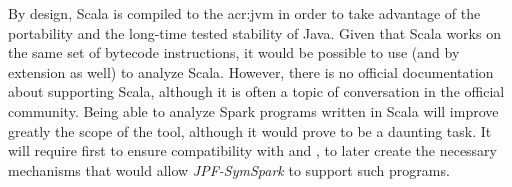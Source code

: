 By design, Scala is compiled to the \acrlong{acr:jvm} in order to take advantage of the portability and the long-time tested stability of Java. Given that Scala works on the same set of bytecode instructions, it would be possible to use \jpf{} (and by extension \spf{} as well) to analyze Scala. However, there is no official documentation about \jpf{} supporting Scala, although it is often a topic of conversation in the official \jpf{} community. Being able to analyze Spark programs written in Scala will improve greatly the scope of the tool, although it would prove to be a daunting task. It will require first to ensure compatibility with \jpf{} and \spf{}, to later create the necessary mechanisms that would allow \textit{JPF-SymSpark} to support such programs.
